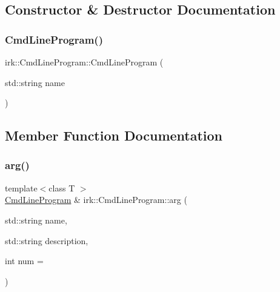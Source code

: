 \subsection{Constructor \& Destructor Documentation}
\mbox{\label{classirk_1_1CmdLineProgram_a92cbb83b26d6b110afea86f79527c9a2}} 
\subsubsection{\texorpdfstring{Cmd\+Line\+Program()}{CmdLineProgram()}}
{\footnotesize\ttfamily irk\+::\+Cmd\+Line\+Program\+::\+Cmd\+Line\+Program (\begin{DoxyParamCaption}\item[{std\+::string}]{name }\end{DoxyParamCaption})\hspace{0.3cm}{\ttfamily [inline]}}



\subsection{Member Function Documentation}
\mbox{\label{classirk_1_1CmdLineProgram_a838fd64b3f1f5648e60e5f96afc3a57f}} 
\subsubsection{\texorpdfstring{arg()}{arg()}}
{\footnotesize\ttfamily template$<$class T $>$ \\
\mbox{\hyperlink{classirk_1_1CmdLineProgram}{Cmd\+Line\+Program}} \& irk\+::\+Cmd\+Line\+Program\+::arg (\begin{DoxyParamCaption}\item[{std\+::string}]{name,  }\item[{std\+::string}]{description,  }\item[{int}]{num = {} }\end{DoxyParamCaption})\hspace{0.3cm}{\ttfamily [inline]}}

